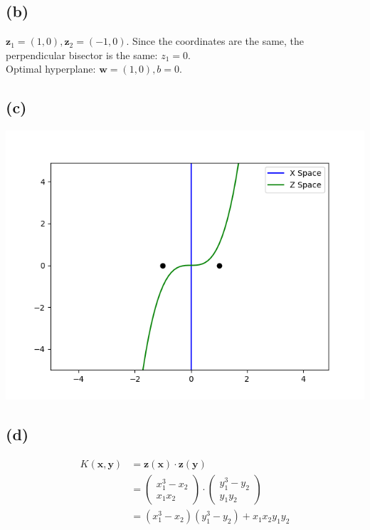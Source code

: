 \documentclass{article}
\begin{document}
	\subsection*{(b)}
		$\mathbf z_1 = (1, 0), \mathbf z_2 = (-1, 0)$. Since the coordinates are the same, the perpendicular bisector is the same: $z_1 = 0$.\\
		Optimal hyperplane: $\mathbf w = (1, 0), b = 0$.
		
	\subsection*{(c)}
		\includegraphics[scale=0.8]{3c.png}
		
	\subsection*{(d)}
		\begin{align*}
			K(\mathbf x, \mathbf y) &= \mathbf z(\mathbf x) \cdot \mathbf z(\mathbf y)\\
			&=
			\begin{pmatrix}
				x_1^3 - x_2\\
				x_1x_2
			\end{pmatrix}
			\cdot
			\begin{pmatrix}
				y_1^3 - y_2\\
				y_1y_2
			\end{pmatrix}\\
			&= \boxed{(x_1^3 - x_2)(y_1^3 - y_2) + x_1x_2y_1y_2}
		\end{align*}
		
\end{document}

